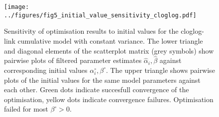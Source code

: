 \begin{figure}[p]
  \centering
  \texttt{[image: ../figures/fig5\_initial\_value\_sensitivity\_cloglog.pdf]}
  \caption{Sensitivity of optimisation results to initial values for the cloglog-link cumulative model with constant variance. The lower triangle and diagonal elements of the scatterplot matrix (grey symbols) show pairwise plots of filtered parameter estimates $\hat{\alpha}_i, \hat{\beta}$ against corresponding initial values $\alpha^{\circ}_i, \beta^{\circ}$. The upper triangle shows pairwise plots of the initial values for the same model parameters against each other. Green dots indicate succesfull convergence of the optimisation, yellow dots indicate convergence failures. Optimisation failed for most $\beta^{\circ}>0$.}
  \label{fig:fig5}
\end{figure} 